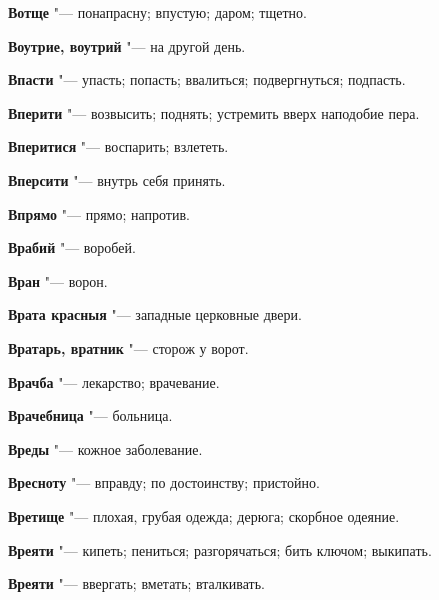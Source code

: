 \begin{mymulticols}{2}
\noindent\textbf{Вотще} "--- понапрасну; впустую; даром; тщетно. 




\noindent\textbf{Воутрие, воутрий} "--- на другой день. 




\noindent\textbf{Впасти} "--- упасть; попасть; ввалиться; подвергнуться; подпасть. 




\noindent\textbf{Вперити} "--- возвысить; поднять; устремить вверх наподобие пера. 




\noindent\textbf{Вперитися} "--- воспарить; взлететь. 




\noindent\textbf{Вперсити} "--- внутрь себя принять. 




\noindent\textbf{Впрямо} "--- прямо; напротив. 




\noindent\textbf{Врабий} "--- воробей. 




\noindent\textbf{Вран} "--- ворон. 




\noindent\textbf{Врата красныя} "--- западные церковные двери. 




\noindent\textbf{Вратарь, вратник} "--- сторож у ворот. 




\noindent\textbf{Врачба} "--- лекарство; врачевание. 




\noindent\textbf{Врачебница} "--- больница. 




\noindent\textbf{Вреды} "--- кожное заболевание. 




\noindent\textbf{Вресноту} "--- вправду; по достоинству; пристойно. 




\noindent\textbf{Вретище} "--- плохая, грубая одежда; дерюга; скорбное одеяние. 




\noindent\textbf{Вреяти} "--- кипеть; пениться; разгорячаться; бить ключом; выкипать. 




\noindent\textbf{Вреяти} "--- ввергать; вметать; вталкивать. 





\end{mymulticols}
